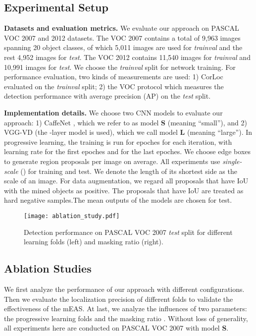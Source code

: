 \documentclass[10pt,twocolumn,letterpaper]{article}
\begin{document}
\subsection{Experimental Setup}
\noindent \textbf{Datasets and evaluation metrics.} We evaluate our approach on PASCAL VOC 2007 \cite{everingham2010pascal} and 2012 \cite{everingham2015pascal} datasets. The VOC 2007 contains a total of 9,963 images spanning 20 object classes, of which 5,011 images are used for \emph{trainval} and the rest 4,952 images for \emph{test}. The VOC 2012 contains 11,540 images for \emph{trainval} and 10,991 images for \emph{test}. We choose the \emph{trainval} split for network training. For performance evaluation, two kinds of measurements are used: 1) CorLoc \cite{deselaers2012weakly} evaluated on the \emph{trainval} split; 2) the VOC protocol which measures the detection performance with average precision (AP) on the \emph{test} split.


\noindent \textbf{Implementation details.}
We choose two CNN models to evaluate our approach: 1) CaffeNet \cite{jia2014caffe}, which we refer to as model \textbf{S} (meaning ``small''), and 2) VGG-VD \cite{Simonyan14c} (the -layer model is used), which we call model \textbf{L} (meaning ``large''). In progressive learning, the training is run for  epoches for each iteration, with learning rate  for the first  epoches and   for the last  epoches. We choose edge boxes \cite{zitnick2014edge} to generate  region proposals per image on average. All experiments use \emph{single-scale} () for training and test. We denote the length of its shortest side as the scale  of an image. For data augmentation, we regard all proposals that have IoU  with the mined objects as positive. The proposals that have IoU  are treated as hard negative samples.The mean outputs of the  models  are chosen for test.

\begin{figure}[t]
  \centering
\texttt{[image: ablation\_study.pdf]} \\
   \vspace{0.1cm}
  \caption{Detection performance on PASCAL VOC 2007 \emph{test} split for different learning folds  (left) and masking ratio  (right).} \label{ablation}
  \vspace{-0.1cm}
\end{figure}
\subsection{Ablation Studies}
We first analyze the performance of our approach with different configurations. Then we evaluate the localization precision of different folds to validate the effectiveness of the mEAS. At last, we analyze the influences of two parameters: the progressive learning folds  and the masking ratio . Without loss of generality, all experiments here are conducted on PASCAL VOC 2007 with model \textbf{S}.
\end{document}
